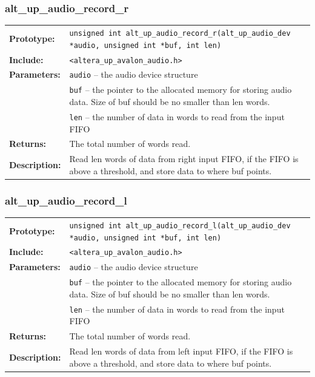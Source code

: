 \subsubsection{alt\_up\_audio\_record\_r}
\begin{tabular}[ht]{lp{11cm}}
	\textbf{Prototype:}
	&
	\texttt{unsigned int alt\_up\_audio\_record\_r(alt\_up\_audio\_dev *audio, unsigned int *buf, int len)} 
	\\
	\textbf{Include:}
	&
	{\tt <altera\_up\_avalon\_audio.h>}
	\\
	{\textbf{Parameters:}}
	&
	\texttt{{audio}}
	 -- the audio device structure 
	\\
	&
	\texttt{{buf}}
	 -- the pointer to the allocated memory for storing audio data. Size of buf should be no smaller than len words. 
	\\
	&
	\texttt{{len}}
	 -- the number of data in words to read from the input FIFO 
	\\
	\textbf{Returns:}
	& The total number of words read.
	\\
	\textbf{Description:}
	& Read len words of data from right input FIFO, if the FIFO is above a threshold, and store data to where buf points.\\
\end{tabular}
\vfill

\subsubsection{alt\_up\_audio\_record\_l}
\begin{tabular}[ht]{lp{11cm}}
	\textbf{Prototype:}
	&
	\texttt{unsigned int alt\_up\_audio\_record\_l(alt\_up\_audio\_dev *audio, unsigned int *buf, int len)} 
	\\
	\textbf{Include:}
	&
	{\tt <altera\_up\_avalon\_audio.h>}
	\\
	{\textbf{Parameters:}}
	&
	\texttt{{audio}}
	 -- the audio device structure 
	\\
	&
	\texttt{{buf}}
	 -- the pointer to the allocated memory for storing audio data. Size of buf should be no smaller than len words. 
	\\
	&
	\texttt{{len}}
	 -- the number of data in words to read from the input FIFO 
	\\
	\textbf{Returns:}
	& The total number of words read.
	\\
	\textbf{Description:}
	& Read len words of data from left input FIFO, if the FIFO is above a threshold, and store data to where buf points.\\
\end{tabular}
\vfill
